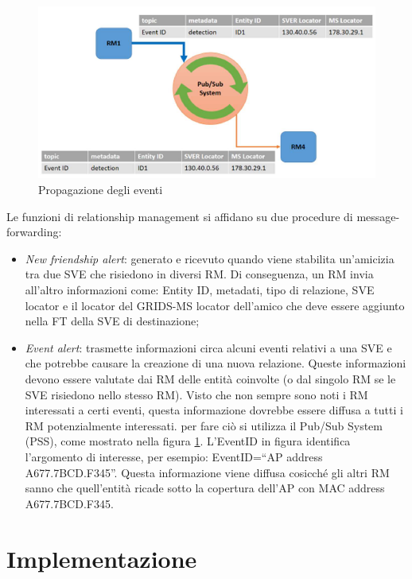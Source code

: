 \begin{figure}[h!t]
\centerline{\includegraphics[scale=0.5]{img/scambiomessaggi}}
\caption{Propagazione degli eventi}
\label{f:grids:scambiomex}
\end{figure}

Le funzioni di relationship management si affidano su due procedure di message-forwarding:

\begin{itemize}
    \item \textit{New friendship alert}: generato e ricevuto quando viene stabilita un'amicizia tra due SVE che risiedono in diversi RM. Di conseguenza, un RM invia all'altro informazioni come: Entity ID, metadati, tipo di relazione, SVE locator e il locator del GRIDS-MS locator dell'amico che deve essere aggiunto nella FT della SVE di destinazione;
    \item \textit{Event alert}: trasmette informazioni circa alcuni eventi relativi a una SVE e che potrebbe causare la creazione di una nuova relazione. Queste informazioni devono essere valutate dai RM delle entità coinvolte (o dal singolo RM se le SVE risiedono nello stesso RM). Visto che non sempre sono noti i RM interessati a certi eventi, questa informazione dovrebbe essere diffusa a tutti i RM potenzialmente interessati. per fare ciò si utilizza il Pub/Sub System (PSS), come mostrato nella figura \ref{f:grids:scambiomex}. L'EventID in figura identifica l'argomento di interesse, per esempio: EventID=“AP address A677.7BCD.F345”. Questa informazione viene diffusa cosicch\'e gli altri RM sanno che quell'entità ricade sotto la copertura dell'AP con MAC address A677.7BCD.F345.
\end{itemize}

\section{Implementazione}
\label{c:grids:implementation}

